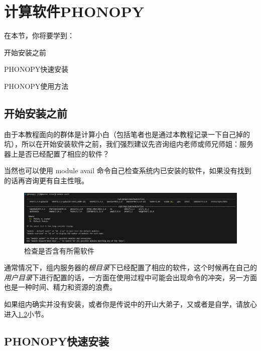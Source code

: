 \section{计算软件PHONOPY}\label{sec:计算软件PHONOPY}


在本节，你将要学到：
\begin{Abstract}
    \item 开始安装之前
    \item PHONOPY快速安装
    \item PHONOPY使用方法
\end{Abstract}

\subsection{开始安装之前}\label{subsec:计算软件PHONOPY-开始安装之前}

由于本教程面向的群体是计算小白（包括笔者也是通过本教程记录一下自己掉的坑），所以在开始安装软件之前，我们强烈建议先咨询组内老师或师兄师姐：服务器上是否已经配置了相应的软件？

\begin{extend}
    当然也可以使用 module avail 命令自己检查系统内已安装的软件，如果没有找到的话再咨询更有自主性哦。
    \begin{figure}
        \centering
        \includegraphics[width=1\linewidth]{module-check.png}
        \caption{检查是否含有所需软件}
        \label{fig:检查软件}
    \end{figure}
\end{extend}

通常情况下，组内服务器的\emph{根目录}下已经配置了相应的软件，这个时候再在自己的\emph{用户目录}下进行配置的话，一方面在使用过程中可能会出现命令的冲突，另一方面也是一种时间、精力和资源的浪费。

如果组内确实并没有安装，或者你是传说中的开山大弟子，又或者是自学，请放心进入\ref{subsec:计算软件PHONOPY-PHONOPY快速安装}小节。

\subsection{PHONOPY快速安装}\label{subsec:计算软件PHONOPY-PHONOPY快速安装}

